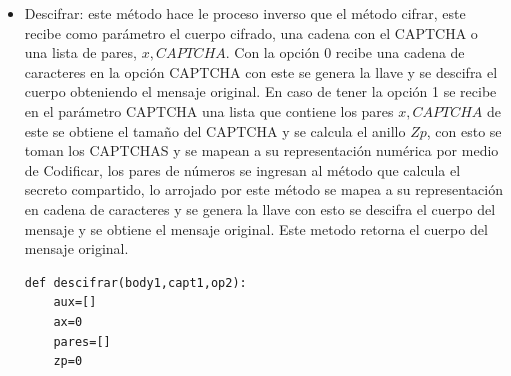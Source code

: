 \documentclass[12pt,oneside,onecolumn,openany]{report}
\begin{document}
\begin{itemize}
Este método en opción 1 genera la semilla, despues calcula $Zp$, mapea a número la semilla por medio de Codificar, con este número se generan los pares del secreto compartido, estos son mapeados a cadena de caracteres y convertidos en CAPTCHAS, se crea la llave y por último se cifra el cuerpo del mensaje con esta, en este caso el método retorna el cuerpo del mensaje cifrado y una lista de pares donde esta el número x y su correspondiente imagen CAPTCHA.
\begin{lstlisting}[frame=single]
 def cifrar(body,asunto1,op1=1,ta=5,w1=5,t1=2):
	ruta=""
	salida=""
	if t1>w1:
		salida=""
		ruta=None
		print("w1 < t1")
		return (salida,ruta)
	semilla3=crearSemilla(ta)
	num=0
	cap=[]
	zp=2**(6*ta)
	#print(semilla3)
	if (op1==0):
		ruta=crearCAPTCHA(0,semilla3,asunto1)
	else:
		ruta=[]
		num=encodeSS(semilla3)
		pares=GenerarPares(zp,w1,t1,num)
		#print(pares)
		for x in pares:
			cap.append(decodeSS(x[1],w1))
		ruta=crearCAPTCHA(op1,cap,asunto1)
		num=0
		#print(cap)
		for x in pares:
			ruta[0][num].insert(0,x[0])
			num=num+1
	k=crearLlave(semilla3)
	obj = AES.new(k, AES.MODE_ECB)
	salida=""
	ax=0
	c=0
	strr=""
	#print len(body)
	while (ax < len(body)):
		while (c<16):
			if (ax>=len(body)):
				strr=strr+" "
			else:
				strr=strr+body[ax]
			c=c+1
			ax=ax+1
			#print str(c) +" " + str(ax) 
		c=0
		#print strr
		ciphertext = obj.encrypt(strr)
		salida=salida+ciphertext
		strr=""
	return (salida,ruta)
\end{lstlisting}
\item Descifrar: este método hace le proceso inverso que el método cifrar, este recibe como parámetro el cuerpo cifrado, una cadena con el CAPTCHA o una lista de pares, $x,CAPTCHA$.
Con la opción 0 recibe una cadena de caracteres en la opción CAPTCHA con este se genera la llave y se descifra el cuerpo obteniendo el mensaje original. En caso de tener la opción 1 se recibe en el parámetro CAPTCHA una lista que contiene los pares $x,CAPTCHA$
 de este se obtiene el tamaño del CAPTCHA y se calcula el anillo $Zp$, con esto se toman los CAPTCHAS y se mapean a su representación numérica por medio de Codificar, los pares de números se ingresan al método que calcula el secreto compartido, lo arrojado por este método se
 mapea a su representación en cadena de caracteres y se genera la llave con esto se descifra el cuerpo del mensaje y se obtiene el mensaje original. Este metodo retorna el cuerpo del mensaje original.
 \begin{lstlisting}[frame=single]
  def descifrar(body1,capt1,op2):
	aux=[]
	ax=0
	pares=[]
	zp=0
	

\end{lstlisting}
\end{itemize}
\end{document}
